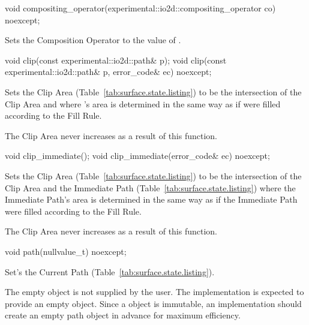 \begin{itemdecl}
void compositing_operator(experimental::io2d::compositing_operator co)
  noexcept;
\end{itemdecl}
\begin{itemdescr}
\pnum
\effects
Sets the Composition Operator to the value of .
\end{itemdescr}

\begin{itemdecl}
void clip(const experimental::io2d::path& p);
void clip(const experimental::io2d::path& p, error_code& ec) noexcept;
\end{itemdecl}
\begin{itemdescr}
\pnum
\effects
Sets the Clip Area (Table~\ref{tab:surface.state.listing}) to be the intersection of the Clip Area and  where 's area is determined in the same way as if  were filled according to the Fill Rule.

\pnum
\realnotes
The Clip Area never increases as a result of this function.
\end{itemdescr}

\begin{itemdecl}
void clip_immediate();
void clip_immediate(error_code& ec) noexcept;
\end{itemdecl}
\begin{itemdescr}
\pnum
\effects
Sets the Clip Area (Table~\ref{tab:surface.state.listing}) to be the intersection of the Clip Area and the Immediate Path (Table~\ref{tab:surface.state.listing}) where the Immediate Path's area is determined in the same way as if the Immediate Path were filled according to the Fill Rule.

\pnum
\realnotes
The Clip Area never increases as a result of this function.
\end{itemdescr}

\begin{itemdecl}
void path(nullvalue_t) noexcept;
\end{itemdecl}
\begin{itemdescr}
\pnum
\effects
Set's the Current Path (Table~\ref{tab:surface.state.listing}).

	\pnum
	\realnotes
	The empty  object is not supplied by the user. The implementation is expected to provide an empty  object. Since a  object is immutable, an implementation should create an empty path object in advance for maximum efficiency.
\end{itemdescr}

